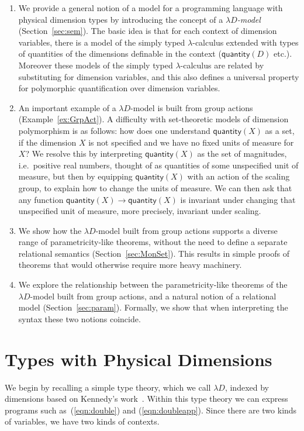 \documentclass[a4paper,UKenglish]{lipics}
\theoremstyle{plain}
\newcommand{\msf}[1]{\mathsf{#1}} %
\newcommand{\qnt}{\msf{quantity}}
\newcommand{\Dvar}{X}
\begin{document}
\begin{enumerate}
\item We provide a general notion of a model for a programming language with physical dimension types by introducing the concept of a \emph{$\lambda D$-model} (Section~\ref{sec:sem}). The basic idea is that for each context of dimension variables, there is a model of the simply typed $\lambda$-calculus extended with types of quantities of the dimensions definable in the context ($\qnt(D)$ etc.). Moreover these models of the simply typed $\lambda$-calculus are related by substituting for dimension variables, and this also defines a universal property for polymorphic quantification over dimension variables.

\item An important example of a $\lambda D$-model is built from group actions (Example~\ref{ex:GrpAct}).
A difficulty with set-theoretic models of dimension polymorphism is as follows: how does one understand $\qnt(\Dvar)$ as a set, if the dimension $\Dvar$ is not specified and we have no fixed units of measure for $\Dvar$? We resolve this by interpreting $\qnt(\Dvar)$ as the set of magnitudes, i.e.~positive real numbers, thought of as quantities of some unspecified unit of measure, but then by equipping $\qnt(\Dvar)$ with an action of the scaling group, to explain how to change the units of measure. We can then ask that any function $\qnt(\Dvar)\to\qnt(\Dvar)$ is invariant under changing that unspecified unit of measure, more precisely, invariant under scaling.

\item We show how the $\lambda D$-model built from group actions supports a diverse range of parametricity-like theorems, without the need to define a separate relational semantics (Section~\ref{sec:MonSet}). This results in simple proofs of theorems that would otherwise require more heavy machinery.

\item We explore the relationship between the parametricity-like theorems of the $\lambda D$-model built from group actions, and a natural notion of a relational model (Section~\ref{sec:param}). Formally, we show that when interpreting the syntax these two notions coincide.
\end{enumerate}


\section{Types with Physical Dimensions}
\label{sec:Not}
We begin by recalling a simple type theory, which we call $\lambda D$, indexed by dimensions based on Kennedy's work~\cite{Kennedy:1997:RPU:263699.263761}. Within this type theory we can express programs such as~(\ref{eqn:double}) and (\ref{eqn:doubleapp}). Since there are two kinds of variables, we have two kinds of contexts.
\end{document}
